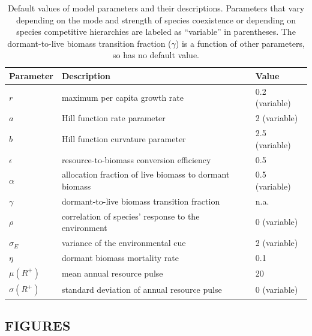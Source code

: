 \documentclass[12pt,]{article}
\begin{document}
\begin{table}[!htbp]
\caption{Default values of model parameters and their descriptions. Parameters that vary depending on the mode and strength of species coexistence or depending on species competitive hierarchies are labeled as ``variable'' in parentheses. The dormant-to-live biomass transition fraction ($\gamma$) is a function of other parameters, so has no default value.}
\begin{tabular}{l l l}
\hline
Parameter & Description & Value \\
\hline
$r$ & maximum per capita growth rate & 0.2 (variable) \\
$a$ & Hill function rate parameter & 2 (variable) \\
$b$ & Hill function curvature parameter & 2.5 (variable) \\
$\epsilon$ & resource-to-biomass conversion efficiency & 0.5 \\
$\alpha$ & allocation fraction of live biomass to dormant biomass & 0.5 (variable) \\
$\gamma$ & dormant-to-live biomass transition fraction & n.a. \\
$\rho$ & correlation of species' response to the environment & 0 (variable) \\
$\sigma_E$ & variance of the environmental cue & 2 (variable) \\
$\eta$ & dormant biomass mortality rate & 0.1 \\
$\mu(R^+)$ & mean annual resource pulse & 20 \\
$\sigma(R^+)$ & standard deviation of annual resource pulse & 0 (variable) \\
\hline
\end{tabular}
\end{table}

\newpage{}

\subsection{FIGURES}\label{figures}
\end{document}
